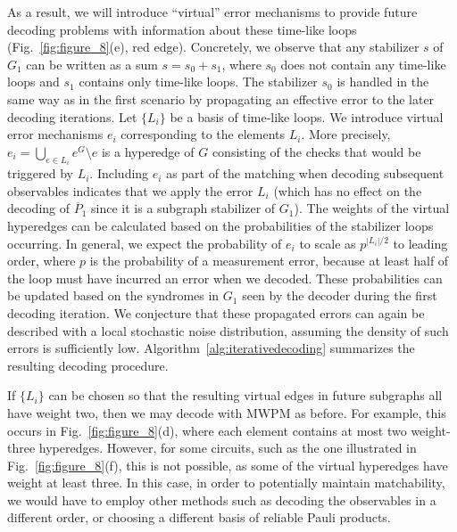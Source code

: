\documentclass[prx,twocolumn,secnumarabic,balancelastpage,amsmath,amssymb,longbibliography]{revtex4-2}
\newcommand{\lop}[1]{\overline{#1}}
\begin{document}
As a result, we will introduce ``virtual'' error mechanisms to provide future decoding problems with information about these time-like loops (Fig.~\ref{fig:figure_8}(e), red edge).
%
Concretely, we observe that any stabilizer $s$ of $G_1$ can be written as a sum $s = s_0 + s_1$, where $s_0$ does not contain any time-like loops and $s_1$ contains only time-like loops. 
%
The stabilizer $s_0$ is handled in the same way as in the first scenario by propagating an effective error to the later decoding iterations. 
%
Let $\{L_i\}$ be a basis of time-like loops. 
%
We introduce virtual error mechanisms $e_{i}$ corresponding to the elements $L_i$. 
%
More precisely, $e_{i} = \bigcup_{e\in L_i}e^G\setminus e$ is a hyperedge of $G$ consisting of the checks that would be triggered by $L_i$. 
%
Including $e_{i}$ as part of the matching when decoding subsequent observables indicates that we apply the error $L_i$ (which has no effect on the decoding of $\lop P_1$ since it is a subgraph stabilizer of $G_1$). 
%
The weights of the virtual hyperedges can be calculated based on the probabilities of the stabilizer loops occurring. 
%
In general, we expect the probability of $e_{i}$ to scale as $p^{|L_i|/2}$ to leading order, where $p$ is the probability of a measurement error, because at least half of the loop must have incurred an error when we decoded.
%
These probabilities can be updated based on the syndromes in $G_1$ seen by the decoder during the first decoding iteration.
%
We conjecture that these propagated errors can again be described with a local stochastic noise distribution, assuming the density of such errors is sufficiently low.
%
Algorithm~\ref{alg:iterativedecoding} summarizes the resulting decoding procedure.

If $\{L_i\}$ can be chosen so that the resulting virtual edges in future subgraphs all have weight two, then we may decode with MWPM as before. 
%
For example, this occurs in Fig.~\ref{fig:figure_8}(d), where each element contains at most two weight-three hyperedges.
%
However, for some circuits, such as the one illustrated in Fig.~\ref{fig:figure_8}(f), this is not possible, as some of the virtual hyperedges have weight at least three. 
%
In this case, in order to potentially maintain matchability, we would have to employ other methods such as decoding the observables in a different order, or choosing a different basis of reliable Pauli products.
\end{document}
